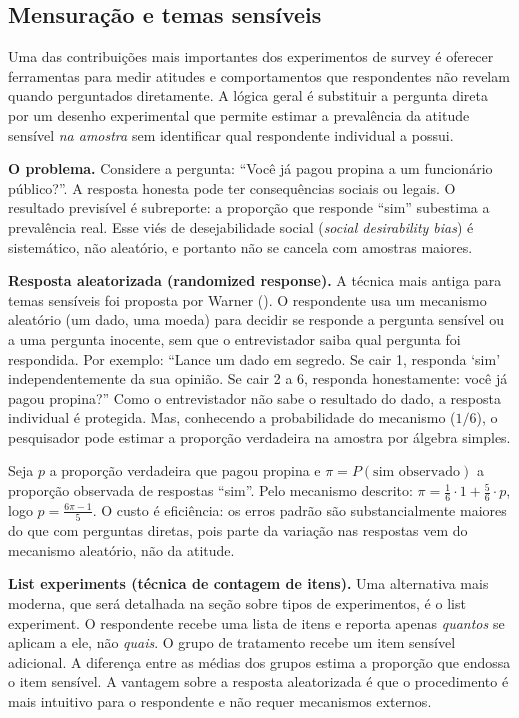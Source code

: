 \documentclass[
]{article}
\begin{document}
\subsection{Mensuração e temas sensíveis}\label{mensurauxe7uxe3o-e-temas-sensuxedveis}

Uma das contribuições mais importantes dos experimentos de survey é oferecer ferramentas para medir atitudes e comportamentos que respondentes não revelam quando perguntados diretamente. A lógica geral é substituir a pergunta direta por um desenho experimental que permite estimar a prevalência da atitude sensível \emph{na amostra} sem identificar qual respondente individual a possui.

\textbf{O problema.} Considere a pergunta: ``Você já pagou propina a um funcionário público?''. A resposta honesta pode ter consequências sociais ou legais. O resultado previsível é subreporte: a proporção que responde ``sim'' subestima a prevalência real. Esse viés de desejabilidade social (\emph{social desirability bias}) é sistemático, não aleatório, e portanto não se cancela com amostras maiores.

\textbf{Resposta aleatorizada (randomized response).} A técnica mais antiga para temas sensíveis foi proposta por Warner (). O respondente usa um mecanismo aleatório (um dado, uma moeda) para decidir se responde a pergunta sensível ou a uma pergunta inocente, sem que o entrevistador saiba qual pergunta foi respondida. Por exemplo: ``Lance um dado em segredo. Se cair 1, responda `sim' independentemente da sua opinião. Se cair 2 a 6, responda honestamente: você já pagou propina?'' Como o entrevistador não sabe o resultado do dado, a resposta individual é protegida. Mas, conhecendo a probabilidade do mecanismo (\(1/6\)), o pesquisador pode estimar a proporção verdadeira na amostra por álgebra simples.

Seja \(p\) a proporção verdadeira que pagou propina e \(\pi = P(\text{sim observado})\) a proporção observada de respostas ``sim''. Pelo mecanismo descrito: \(\pi = \frac{1}{6} \cdot 1 + \frac{5}{6} \cdot p\), logo \(p = \frac{6\pi - 1}{5}\). O custo é eficiência: os erros padrão são substancialmente maiores do que com perguntas diretas, pois parte da variação nas respostas vem do mecanismo aleatório, não da atitude.

\textbf{List experiments (técnica de contagem de itens).} Uma alternativa mais moderna, que será detalhada na seção sobre tipos de experimentos, é o list experiment. O respondente recebe uma lista de itens e reporta apenas \emph{quantos} se aplicam a ele, não \emph{quais}. O grupo de tratamento recebe um item sensível adicional. A diferença entre as médias dos grupos estima a proporção que endossa o item sensível. A vantagem sobre a resposta aleatorizada é que o procedimento é mais intuitivo para o respondente e não requer mecanismos externos.
\end{document}
